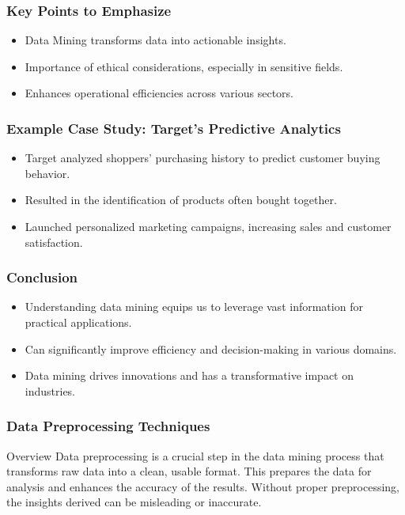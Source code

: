 \documentclass{beamer}
\begin{document}
\begin{frame}[fragile]
    \frametitle{Key Points to Emphasize}
    \begin{itemize}
        \item Data Mining transforms data into actionable insights.
        \item Importance of ethical considerations, especially in sensitive fields.
        \item Enhances operational efficiencies across various sectors.
    \end{itemize}
\end{frame}

\begin{frame}[fragile]
    \frametitle{Example Case Study: Target's Predictive Analytics}
    \begin{itemize}
        \item Target analyzed shoppers' purchasing history to predict customer buying behavior.
        \item Resulted in the identification of products often bought together.
        \item Launched personalized marketing campaigns, increasing sales and customer satisfaction.
    \end{itemize}
\end{frame}

\begin{frame}[fragile]
    \frametitle{Conclusion}
    \begin{itemize}
        \item Understanding data mining equips us to leverage vast information for practical applications.
        \item Can significantly improve efficiency and decision-making in various domains.
        \item Data mining drives innovations and has a transformative impact on industries.
    \end{itemize}
\end{frame}

\begin{frame}[fragile]
    \frametitle{Data Preprocessing Techniques}
    
    \begin{block}{Overview}
        Data preprocessing is a crucial step in the data mining process that transforms raw data into a clean, usable format. This prepares the data for analysis and enhances the accuracy of the results. Without proper preprocessing, the insights derived can be misleading or inaccurate.
    \end{block}
\end{frame}
\end{document}
